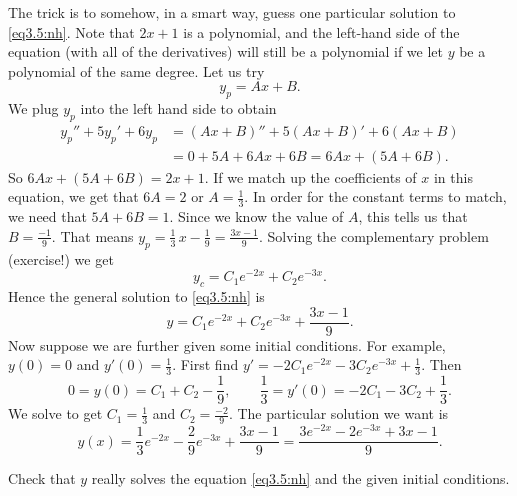\documentclass{ximera}
\begin{document}
The trick is to somehow, in a smart way, guess one particular solution to \eqref{eq3.5:nh}.  Note that $2x+1$ is a polynomial, and the left-hand side of the equation (with all of the derivatives) will still be a polynomial if we let $y$ be a polynomial of the same degree.  Let us try
\begin{equation*}
    y_p = Ax + B .
\end{equation*}
We plug $y_p$ into the left hand side to obtain
\begin{equation*}
    \begin{split}
        y_p'' + 5y_p'+ 6y_p & = (Ax+B)'' + 5(Ax+B)' + 6(Ax+B) \\
        & =  0 + 5A + 6Ax + 6B = 6Ax+ (5A+6B) .
    \end{split}
\end{equation*}
So $6Ax+(5A+6B) = 2x+1$. If we match up the coefficients of $x$ in this equation, we get that $6A = 2$ or $A = \frac{1}{3}$. In order for the constant terms to match, we need that $5A + 6B = 1$. Since we know the value of $A$, this tells us that $B = \frac{-1}{9}$. That means $y_p = \frac{1}{3}\, x - \frac{1}{9} = \frac{3x-1}{9}$. Solving the complementary problem (exercise!) we get
\begin{equation*}
    y_c = C_1 e^{-2x} + C_2 e^{-3x}.
\end{equation*}
Hence the general solution to \eqref{eq3.5:nh} is
\begin{equation*}
    y = C_1 e^{-2x} + C_2 e^{-3x} + \frac{3x-1}{9} .
\end{equation*}
Now suppose we are further given some initial conditions.  For example, $y(0) = 0$ and $y'(0) = \frac{1}{3}$.  First find $y' = - 2C_1 e^{-2x} - 3C_2 e^{-3x}
+ \frac{1}{3}$. Then
\begin{equation*}
    0 = y(0) = C_1 + C_2 -\frac{1}{9} , \qquad \frac{1}{3} = y'(0) = - 2C_1 - 3C_2 + \frac{1}{3} .
\end{equation*}
We solve to get $C_1 = \frac{1}{3}$ and $C_2 = \frac{-2}{9}$. The particular solution we want is
\begin{equation*}
    y(x) = \frac{1}{3} e^{-2x} - \frac{2}{9} e^{-3x} + \frac{3x-1}{9} = \frac{3 e^{-2x} - 2 e^{-3x} + 3x-1}{9} .
\end{equation*}

\begin{exercise}
Check that $y$ really solves the equation \eqref{eq3.5:nh} and the given initial conditions.
\end{exercise}
\end{document}
